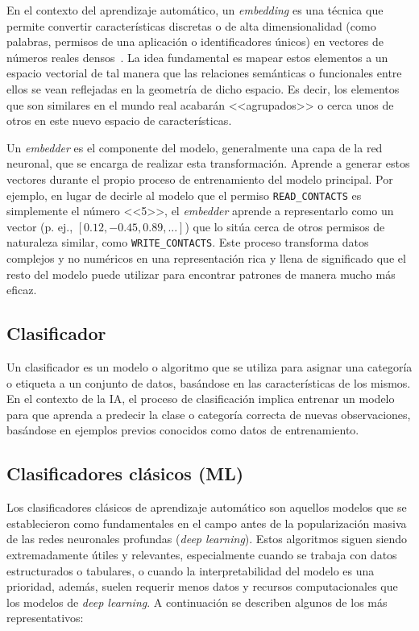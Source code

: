 En el contexto del aprendizaje automático, un \textit{embedding} es una técnica que permite convertir características discretas o de alta dimensionalidad (como palabras, permisos de una aplicación o identificadores únicos) en vectores de números reales densos~\cite{bengio2003neural}. La idea fundamental es mapear estos elementos a un espacio vectorial de tal manera que las relaciones semánticas o funcionales entre ellos se vean reflejadas en la geometría de dicho espacio. Es decir, los elementos que son similares en el mundo real acabarán <<agrupados>> o cerca unos de otros en este nuevo espacio de características.

Un \textit{embedder} es el componente del modelo, generalmente una capa de la red neuronal, que se encarga de realizar esta transformación. Aprende a generar estos vectores durante el propio proceso de entrenamiento del modelo principal. Por ejemplo, en lugar de decirle al modelo que el permiso \texttt{READ\_CONTACTS} es simplemente el número <<5>>, el \textit{embedder} aprende a representarlo como un vector (p. ej., $[0.12, -0.45, 0.89, ...]$) que lo sitúa cerca de otros permisos de naturaleza similar, como \texttt{WRITE\_CONTACTS}. Este proceso transforma datos complejos y no numéricos en una representación rica y llena de significado que el resto del modelo puede utilizar para encontrar patrones de manera mucho más eficaz.

\subsection{Clasificador}

Un clasificador es un modelo o algoritmo que se utiliza para asignar una categoría o etiqueta a un conjunto de datos, basándose en las características de los mismos. En el contexto de la IA, el proceso de clasificación implica entrenar un modelo para que aprenda a predecir la clase o categoría correcta de nuevas observaciones, basándose en ejemplos previos conocidos como datos de entrenamiento.

\subsection{Clasificadores clásicos (ML)}

Los clasificadores clásicos de aprendizaje automático son aquellos modelos que se establecieron como fundamentales en el campo antes de la popularización masiva de las redes neuronales profundas (\textit{deep learning}). Estos algoritmos siguen siendo extremadamente útiles y relevantes, especialmente cuando se trabaja con datos estructurados o tabulares, o cuando la interpretabilidad del modelo es una prioridad, además, suelen requerir menos datos y recursos computacionales que los modelos de \textit{deep learning}. A continuación se describen algunos de los más representativos:

